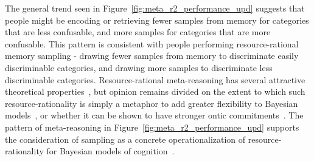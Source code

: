 \documentclass[10pt,letterpaper]{article}
\begin{document}

The general trend seen in Figure~\ref{fig:meta_r2_performance_upd} suggests that people might be encoding or retrieving fewer samples from memory for categories that are less confusable, and more samples for categories that are more confusable. This pattern is consistent with people performing resource-rational memory sampling - drawing fewer samples from memory to discriminate easily discriminable categories, and drawing more samples to discriminate less discriminable categories. Resource-rational meta-reasoning has several attractive theoretical properties~\cite{griffiths2015rational}, but opinion remains divided on the extent to which such resource-rationality is simply a metaphor to add greater flexibility to Bayesian models~\cite{rahnev2020resource}, or whether it can be shown to have stronger ontic commitments~\cite{griffiths2015rational}. The pattern of meta-reasoning in Figure~\ref{fig:meta_r2_performance_upd} supports the consideration of sampling as a concrete operationalization of resource-rationality for Bayesian models of cognition~\cite{srivastava2014frugal, sanborn2016bayesian}. 


\end{document}
